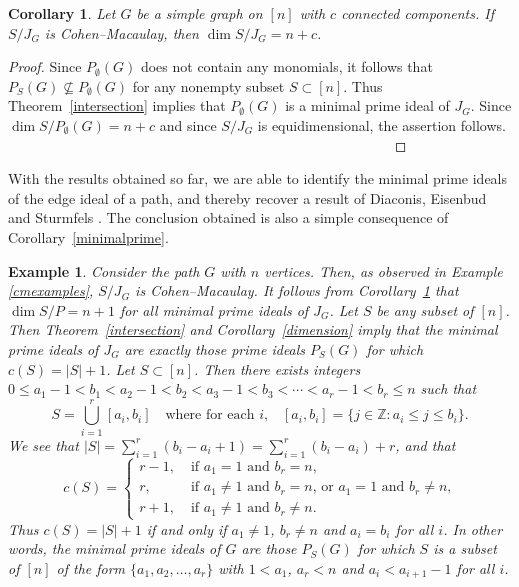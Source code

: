 \documentclass[11pt]{amsart}
\def\NZQ{\mathbb}               %
\def\ZZ{{\NZQ Z}}
\let\Union=\bigcup
\let\:=\colon
\newtheorem{Corollary}[Theorem]{Corollary}
\newtheorem{Example}[Theorem]{Example}
\begin{document}
\begin{Corollary}
\label{beingcm}
Let $G$ be a simple graph on $[n]$ with $c$ connected components. If $S/J_G$ is Cohen--Macaulay, then $\dim S/J_G=n+c$.
\end{Corollary}


\begin{proof}
Since $P_\emptyset(G)$ does not contain any monomials, it follows that $P_S(G)\nsubseteq P_\emptyset(G)$ for any nonempty subset $S\subset [n]$. Thus Theorem~\ref{intersection} implies that $P_\emptyset(G)$ is a minimal prime ideal of $J_G$. Since $\dim S/P_\emptyset(G)=n+c$
and since $S/J_G$ is equidimensional, the assertion follows.
\, \, \, \, \, \, \, \, \, \,
\, \, \, \, \, \, \, \, \, \,
\, \, \, \, \, \, \, \, \, \,
\, \, \, \, \, \, \, \, \, \,
\, \, \, \, \, \, \, \, \, \,
\, \, \, \, \,
\end{proof}


With the results obtained so far, we  are able to  identify  the minimal prime ideals of the edge ideal of a path, and thereby recover a result of Diaconis, Eisenbud and  Sturmfels \cite[Theorem 4.3]{DES}. The conclusion obtained is also a simple consequence of Corollary~\ref{minimalprime}.

\begin{Example}
{\em
Consider the path $G$ with $n$ vertices. Then, as observed in Example \ref{cmexamples}, $S/J_G$ is Cohen--Macaulay. It follows from Corollary~\ref{beingcm} that $\dim S/P=n+1$ for all minimal prime ideals of $J_G$. Let $S$ be any subset of $[n]$. Then Theorem~\ref{intersection} and Corollary~\ref{dimension} imply that  the  minimal prime ideals of $J_G$  are exactly those prime ideals $P_S(G)$ for which $c(S)=|S|+1$. Let $S\subset [n]$.  Then there exists integers $0\leq a_1-1< b_1<a_2-1< b_2<a_3-1< b_3<\cdots <a_r-1< b_r\leq n$ such that
\[
S=\Union_{i=1}^r[a_i,b_i]\quad \text{where for each $i$,}\quad [a_i,b_i]=\{j\in\ZZ\: a_i\leq j\leq b_i \}.
\]
We see that $|S|=\sum_{i=1}^r(b_i-a_i+1)=\sum_{i=1}^r(b_i-a_i)+r$, and that
\[
c(S)= \left\{ \begin{array}{ll}
       r-1, & \;\text{if $a_1=1$ and $b_r=n$}, \\
       r, & \;\text{if $a_1\neq 1$ and $b_r=n$, or $a_1=1$ and $b_r\neq n$,}\\
       r+1, &\; \text{if $a_1\neq 1$ and $b_r\neq n$.}
        \end{array} \right.
\]
Thus $c(S)=|S|+1$ if and only if $a_1\neq 1$, $b_r\neq n$ and $a_i=b_i$ for all $i$. In other words, the minimal prime ideals of $G$ are those $P_S(G)$ for which $S$ is a subset of $[n]$ of the form $\{a_1,a_2,\ldots,a_r\}$ with $1<a_1$, $a_r<n$ and $a_i<a_{i+1}-1$ for all $i$.
}
\end{Example}
\end{document}
